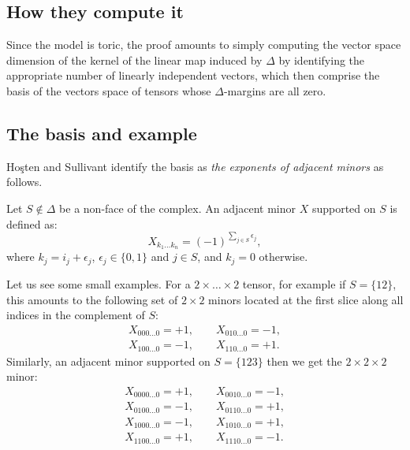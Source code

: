 \documentclass[12pt]{extarticle}
\theoremstyle{definition}
\numberwithin{theorem}{section}
\begin{document}


\subsection*{How they compute it}
Since the model is toric, the proof amounts to simply computing the vector space dimension of the kernel of the linear map induced by $\Delta$ by identifying the appropriate number of linearly independent vectors, which then comprise the basis of the vectors space of tensors whose $\Delta$-margins are all zero.  

\subsection*{The basis and example} 
Ho\c{s}ten and Sullivant identify  the basis as \emph{the exponents of adjacent minors}  as follows. 

Let $S\not\in\Delta$ be a non-face of the complex. An adjacent minor $X$ supported on $S$ is defined as: 
\[
	X_{k_1\dots k_n} =(-1)^{\sum_{j\in S}\epsilon_j}, 
\]
where $k_j=i_j+\epsilon_j$, $\epsilon_j\in\{0,1\}$ and $j\in S$, and $k_j=0$ otherwise.


Let us see some small examples. 
For a $2\times\dots\times2$ tensor, for example if $S=\{12\}$, this amounts to the following set of  $2\times 2$ minors
 located at the  first slice along all indices in the complement of $S$: 
\begin{align*}
	X_{000\dots0} = +1, \qquad X_{010\dots0} =-1,\\ 
	X_{100\dots0} =-1, \qquad 	X_{110\dots0}  =+1.
\end{align*}
Similarly, an adjacent minor supported on $S=\{123\}$ then we get the $2\times2\times2$ minor: 
\begin{align*}
	X_{0000\dots0} = +1, \qquad X_{0010\dots0} =-1,\\ 
	X_{0100\dots0} = -1, \qquad X_{0110\dots0} =+1,\\ 
	X_{1000\dots0} = -1, \qquad X_{1010\dots0} =+1,\\ 	
	X_{1100\dots0} =+1, \qquad 	X_{1110\dots0}  =-1.
\end{align*}
\end{document}
